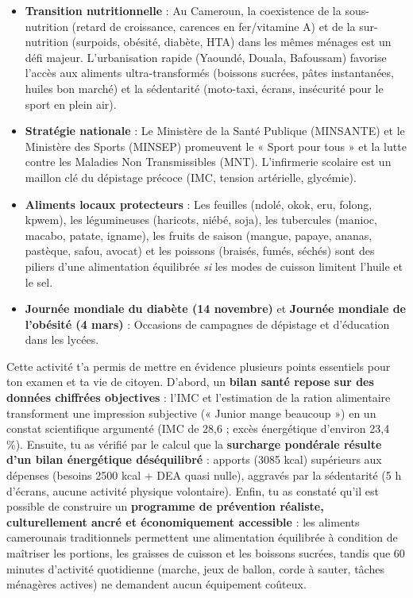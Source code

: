 \documentclass[11pt]{article}
\newcounter{popsec}
\newcounter{popsub}
\newcommand{\courssub}[1]{%
  \stepcounter{popsub}%
  \par\vspace{9pt}\noindent{\popxbold\fontsize{11.5}{13}\selectfont\color{popink}{\color{poporange}\thepopsec.\thepopsub}\hspace{6pt}#1}\par\nopagebreak\vspace{4pt}
}
\begin{document}
\begin{savaistu}
\begin{itemize}
\item \textbf{Transition nutritionnelle} : Au Cameroun, la coexistence de la sous-nutrition (retard de croissance, carences en fer/vitamine A) et de la sur-nutrition (surpoids, obésité, diabète, HTA) dans les mêmes ménages est un défi majeur. L'urbanisation rapide (Yaoundé, Douala, Bafoussam) favorise l'accès aux aliments ultra-transformés (boissons sucrées, pâtes instantanées, huiles bon marché) et la sédentarité (moto-taxi, écrans, insécurité pour le sport en plein air).
\item \textbf{Stratégie nationale} : Le Ministère de la Santé Publique (MINSANTE) et le Ministère des Sports (MINSEP) promeuvent le « Sport pour tous » et la lutte contre les Maladies Non Transmissibles (MNT). L'infirmerie scolaire est un maillon clé du dépistage précoce (IMC, tension artérielle, glycémie).
\item \textbf{Aliments locaux protecteurs} : Les feuilles (ndolé, okok, eru, folong, kpwem), les légumineuses (haricots, niébé, soja), les tubercules (manioc, macabo, patate, igname), les fruits de saison (mangue, papaye, ananas, pastèque, safou, avocat) et les poissons (braisés, fumés, séchés) sont des piliers d'une alimentation équilibrée \emph{si} les modes de cuisson limitent l'huile et le sel.
\item \textbf{Journée mondiale du diabète (14 novembre)} et \textbf{Journée mondiale de l'obésité (4 mars)} : Occasions de campagnes de dépistage et d'éducation dans les lycées.
\end{itemize}
\end{savaistu}

\courssub{Bilan de l'activité}

Cette activité t'a permis de mettre en évidence plusieurs points essentiels pour ton examen et ta vie de citoyen. D'abord, un \textbf{bilan santé repose sur des données chiffrées objectives} : l'IMC et l'estimation de la ration alimentaire transforment une impression subjective (« Junior mange beaucoup ») en un constat scientifique argumenté (IMC de 28,6 ; excès énergétique d'environ 23,4 \%). Ensuite, tu as vérifié par le calcul que la \textbf{surcharge pondérale résulte d'un bilan énergétique déséquilibré} : apports (3085 kcal) supérieurs aux dépenses (besoins 2500 kcal + DEA quasi nulle), aggravés par la sédentarité (5 h d'écrans, aucune activité physique volontaire). Enfin, tu as constaté qu'il est possible de construire un \textbf{programme de prévention réaliste, culturellement ancré et économiquement accessible} : les aliments camerounais traditionnels permettent une alimentation équilibrée à condition de maîtriser les portions, les graisses de cuisson et les boissons sucrées, tandis que 60 minutes d'activité quotidienne (marche, jeux de ballon, corde à sauter, tâches ménagères actives) ne demandent aucun équipement coûteux.
\end{document}
